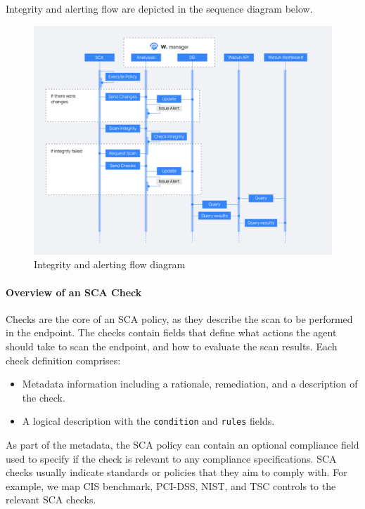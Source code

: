 Integrity and alerting flow are depicted in the sequence diagram below.
\begin{figure} [H]
    \centering
    \includegraphics[width=\textwidth]{images/sca/sca-11.png}
    \caption{Integrity and alerting flow diagram}
    \label{fig:sca-11}
\end{figure}

\paragraph{Overview of an SCA Check}
Checks are the core of an SCA policy, as they describe the scan to be performed in the endpoint. The checks contain fields that define what actions the agent should take to scan the endpoint, and how to evaluate the scan results. Each check definition comprises:

\begin{itemize}
    \item Metadata information including a rationale, remediation, and a description of the check.
    \item A logical description with the \texttt{condition} and \texttt{rules} fields.
\end{itemize}

As part of the metadata, the SCA policy can contain an optional compliance field used to specify if the check is relevant to any compliance specifications. SCA checks usually indicate standards or policies that they aim to comply with. For example, we map CIS benchmark, PCI-DSS, NIST, and TSC controls to the relevant SCA checks.

